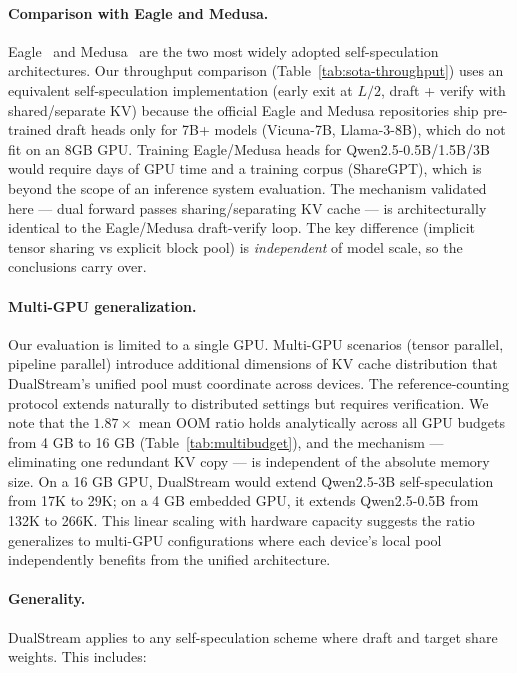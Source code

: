\documentclass[review]{elsarticle}
\theoremstyle{definition}
\theoremstyle{remark}
\begin{document}
\paragraph{Comparison with Eagle and Medusa.}
Eagle~\cite{eagle2024} and Medusa~\cite{medusa2024} are the two most
widely adopted self-speculation architectures. Our throughput comparison
(Table~\ref{tab:sota-throughput}) uses an equivalent self-speculation
implementation (early exit at $L/2$, draft + verify with shared/separate KV)
because the official Eagle and Medusa repositories ship pre-trained draft
heads only for 7B+ models (Vicuna-7B, Llama-3-8B), which do not fit on
an 8GB GPU. Training Eagle/Medusa heads for Qwen2.5-0.5B/1.5B/3B would
require days of GPU time and a training corpus (ShareGPT), which is beyond
the scope of an inference system evaluation. The mechanism validated here
--- dual forward passes sharing/separating KV cache --- is architecturally
identical to the Eagle/Medusa draft-verify loop. The key difference
(implicit tensor sharing vs explicit block pool) is \emph{independent}
of model scale, so the conclusions carry over.

\paragraph{Multi-GPU generalization.}
Our evaluation is limited to a single GPU. Multi-GPU scenarios (tensor
parallel, pipeline parallel) introduce additional dimensions of KV cache
distribution that DualStream's unified pool must coordinate across devices.
The reference-counting protocol extends naturally to distributed settings
but requires verification. We note that the $1.87\times$ mean OOM ratio holds
analytically across all GPU budgets from 4 GB to 16 GB
(Table~\ref{tab:multibudget}), and the mechanism --- eliminating one
redundant KV copy --- is independent of the absolute memory size. On a
16 GB GPU, DualStream would extend Qwen2.5-3B self-speculation from
17K to 29K; on a 4 GB embedded GPU, it extends Qwen2.5-0.5B from
132K to 266K. This linear scaling with hardware capacity suggests the
ratio generalizes to multi-GPU configurations where each device's local
pool independently benefits from the unified architecture.

\paragraph{Generality.}
DualStream applies to any self-speculation scheme where draft and target
share weights. This includes:
\end{document}
